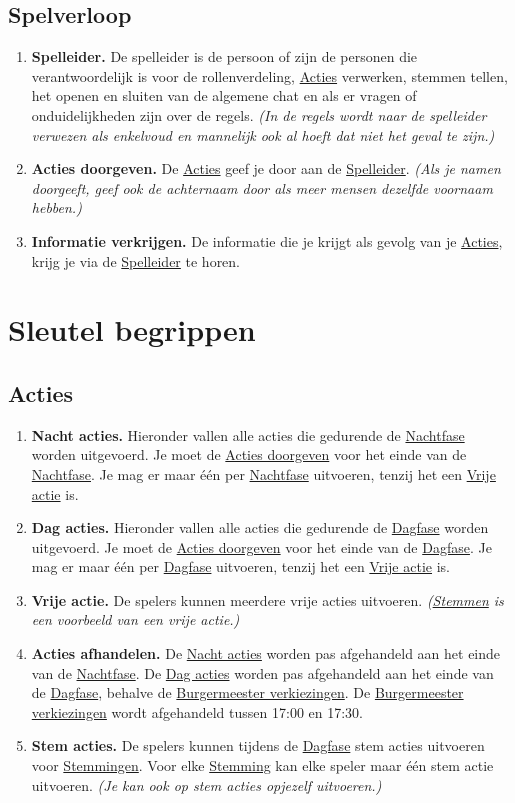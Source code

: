 \documentclass{article}
\newenvironment{rulesubsection}[1]{
    \subsection{#1} \label{rule:#1}
    \begin{enumerate}[label=\thesubsection.\arabic{enumi}]
}{
    \end{enumerate}
}
\newcommand{\ruleitem}[1]{\item \label{rule:#1} \textbf{#1.}}
\newcommand{\ruleref}[1]{\hyperref[rule:#1]{#1}}
\begin{document}
\begin{rulesubsection}{Spelverloop}
    \ruleitem{Spelleider} De spelleider is de persoon of zijn de personen die verantwoordelijk is voor de rollenverdeling,
    \ruleref{Acties} verwerken, stemmen tellen, het openen en sluiten van de algemene chat en als er vragen of onduidelijkheden zijn over de regels.
    \textit{(In de regels wordt naar de spelleider verwezen als enkelvoud en mannelijk ook al hoeft dat niet het geval te zijn.)}
    \ruleitem{Acties doorgeven} De \ruleref{Acties} geef je door aan de \ruleref{Spelleider}. \textit{(Als je namen doorgeeft, geef ook de achternaam door
    als meer mensen dezelfde voornaam hebben.)}
    \ruleitem{Informatie verkrijgen} De informatie die je krijgt als gevolg van je \ruleref{Acties}, krijg je via de \ruleref{Spelleider} te horen.
\end{rulesubsection}

\section{Sleutel begrippen}
\begin{rulesubsection}{Acties}
    \ruleitem{Nacht acties} Hieronder vallen alle acties die gedurende de \ruleref{Nachtfase} worden uitgevoerd. 
    Je moet de \ruleref{Acties doorgeven} voor het einde van de \ruleref{Nachtfase}. Je mag er maar één per \ruleref{Nachtfase} uitvoeren,
    tenzij het een \ruleref{Vrije actie} is.
    \ruleitem{Dag acties} Hieronder vallen alle acties die gedurende de \ruleref{Dagfase} worden uitgevoerd.
    Je moet de \ruleref{Acties doorgeven} voor het einde van de \ruleref{Dagfase}. Je mag er maar één per \ruleref{Dagfase} uitvoeren,
    tenzij het een \ruleref{Vrije actie} is.
    \ruleitem{Vrije actie} De spelers kunnen meerdere vrije acties uitvoeren. \textit{(\ruleref{Stemmen} is een voorbeeld van een vrije actie.)}
    \ruleitem{Acties afhandelen} De \ruleref{Nacht acties} worden pas afgehandeld aan het einde van de \ruleref{Nachtfase}.
    De \ruleref{Dag acties} worden pas afgehandeld aan het einde van de \ruleref{Dagfase}, behalve de \ruleref{Burgermeester verkiezingen}.
    De \ruleref{Burgermeester verkiezingen} wordt afgehandeld tussen 17:00 en 17:30.
    \ruleitem{Stem acties} De spelers kunnen tijdens de \ruleref{Dagfase} stem acties uitvoeren voor \ruleref{Stemmingen}. 
    Voor elke \hyperref[rule:Stemmingen]{Stemming} kan elke speler maar één stem actie uitvoeren. \textit{(Je kan ook op stem acties opjezelf uitvoeren.)}
\end{rulesubsection}
\end{document}
